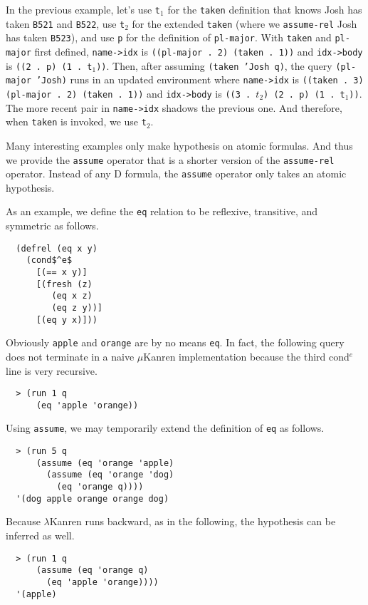 \documentclass[acmlarge,review]{acmart}
\theoremstyle{definition}
\begin{document}
In the previous example, let's use \texttt{t$_1$} for the \texttt{taken}
definition that knows Josh has taken \texttt{B521} and \texttt{B522},
use \texttt{t$_2$} for the extended \texttt{taken}
(where we \texttt{assume-rel} Josh has taken \texttt{B523}), and use \texttt{p} for
the definition of \texttt{pl-major}.
With \texttt{taken} and \texttt{pl-major} first defined,
\texttt{name->idx} is \texttt{((pl-major . 2) (taken . 1))}
and \texttt{idx->body} is \mbox{\texttt{((2 . p) (1 . t$_1$))}}.
Then, after assuming \texttt{(taken 'Josh q)}, the query \texttt{(pl-major 'Josh)}
runs in an updated environment where 
\texttt{name->idx} is \texttt{((taken . 3) (pl-major . 2) (taken . 1))}
and \texttt{idx->body} is \mbox{\texttt{((3 . $t_2$) (2 . p) (1 . t$_1$))}}.
The more recent pair in \texttt{name->idx} shadows the previous one. And therefore,
when \texttt{taken} is invoked, we use \texttt{t$_2$}.

Many interesting examples only make hypothesis on atomic formulas. And thus we
provide the \texttt{assume} operator that is a shorter version of the
\texttt{assume-rel} operator. Instead of any D formula, the \texttt{assume}
operator only takes an atomic hypothesis.

As an example, we define the \texttt{eq} relation to be reflexive, transitive,
and symmetric as follows.
\begin{lstlisting}
  (defrel (eq x y)
    (cond$^e$
      [(== x y)]
      [(fresh (z)
         (eq x z)
         (eq z y))]
      [(eq y x)]))
\end{lstlisting}
Obviously \texttt{apple} and \texttt{orange} are by no means \texttt{eq}. 
In fact, the following query does not terminate in a naive $\mu$Kanren
implementation because the third cond$^e$ line is very recursive.
\begin{lstlisting}
  > (run 1 q
      (eq 'apple 'orange))
\end{lstlisting}

\clearpage

Using \texttt{assume}, we may temporarily extend the definition of
\texttt{eq} as follows.
\begin{lstlisting}
  > (run 5 q
      (assume (eq 'orange 'apple)
        (assume (eq 'orange 'dog)  
          (eq 'orange q))))
  '(dog apple orange orange dog)
\end{lstlisting}

Because $\lambda$Kanren runs backward, as in the following,
the hypothesis can be inferred as well.
\begin{lstlisting}
  > (run 1 q
      (assume (eq 'orange q)
        (eq 'apple 'orange))))
  '(apple)
\end{lstlisting}
\end{document}
